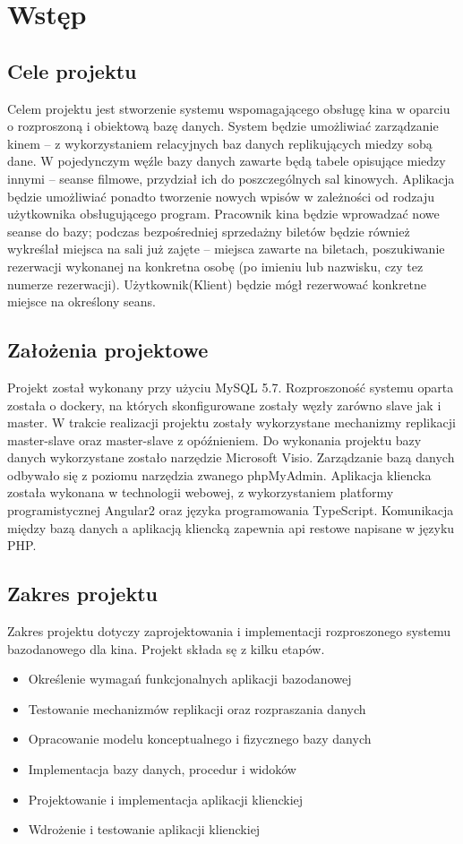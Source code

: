 \chapter{Wstęp}

\section{Cele projektu}
Celem projektu jest stworzenie systemu wspomagającego obsługę kina w oparciu o rozproszoną i obiektową bazę danych. System będzie umożliwiać zarządzanie kinem – z wykorzystaniem relacyjnych baz danych replikujących miedzy sobą dane. W pojedynczym węźle bazy danych zawarte będą tabele opisujące miedzy innymi – seanse filmowe, przydział ich do poszczególnych sal kinowych. Aplikacja będzie umożliwiać ponadto tworzenie nowych wpisów w zależności od rodzaju użytkownika obsługującego program. Pracownik kina będzie wprowadzać nowe seanse do bazy; podczas bezpośredniej sprzedażny biletów będzie również wykreślał miejsca
na sali już zajęte – miejsca zawarte na biletach, poszukiwanie rezerwacji wykonanej na konkretna osobę (po imieniu lub nazwisku, czy tez numerze rezerwacji). Użytkownik(Klient) będzie mógł rezerwować konkretne miejsce na określony seans.

\section{Założenia projektowe}
Projekt został wykonany przy użyciu MySQL 5.7. Rozproszoność systemu oparta została o dockery, na których skonfigurowane zostały węzły zarówno slave jak i master. W trakcie realizacji projektu zostały wykorzystane mechanizmy replikacji master-slave oraz master-slave z opóźnieniem. Do wykonania projektu bazy danych wykorzystane zostało narzędzie Microsoft Visio. Zarządzanie bazą danych odbywało się z poziomu narzędzia zwanego phpMyAdmin. Aplikacja kliencka została wykonana w technologii webowej, z wykorzystaniem platformy programistycznej Angular2 oraz języka programowania TypeScript. Komunikacja między bazą danych a aplikacją kliencką zapewnia api restowe napisane w języku PHP. 

\section{Zakres projektu}
Zakres projektu dotyczy zaprojektowania i implementacji rozproszonego systemu bazodanowego dla kina. Projekt składa sę z kilku etapów.

\begin{itemize}
	\item Określenie wymagań funkcjonalnych aplikacji bazodanowej
	\item Testowanie mechanizmów replikacji oraz rozpraszania danych
	\item Opracowanie modelu konceptualnego i fizycznego bazy danych
	\item Implementacja bazy danych, procedur i widoków
	\item Projektowanie i implementacja aplikacji klienckiej
	\item Wdrożenie i testowanie aplikacji klienckiej
\end{itemize}

